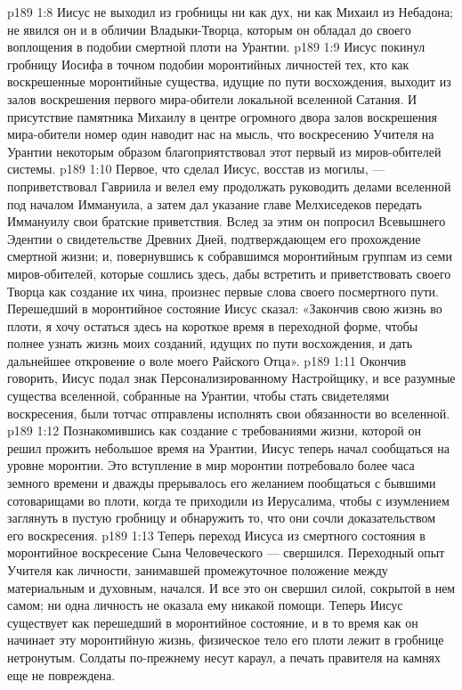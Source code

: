 \vs p189 1:8 \bibnobreakspace Иисус не выходил из гробницы ни как дух, ни как Михаил из Небадона; не явился он и в обличии Владыки\hyp{}Творца, которым он обладал до своего воплощения в подобии смертной плоти на Урантии.
\vs p189 1:9 \bibnobreakspace Иисус покинул гробницу Иосифа в точном подобии моронтийных личностей тех, кто как воскрешенные моронтийные существа, идущие по пути восхождения, выходит из залов воскрешения первого мира\hyp{}обители локальной вселенной Сатания. И присутствие памятника Михаилу в центре огромного двора залов воскрешения мира\hyp{}обители номер один наводит нас на мысль, что воскресению Учителя на Урантии некоторым образом благоприятствовал этот первый из миров\hyp{}обителей системы.
\vs p189 1:10 \pc Первое, что сделал Иисус, восстав из могилы, --- поприветствовал Гавриила и велел ему продолжать руководить делами вселенной под началом Иммануила, а затем дал указание главе Мелхиседеков передать Иммануилу свои братские приветствия. Вслед за этим он попросил Всевышнего Эдентии о свидетельстве Древних Дней, подтверждающем его прохождение смертной жизни; и, повернувшись к собравшимся моронтийным группам из семи миров\hyp{}обителей, которые сошлись здесь, дабы встретить и приветствовать своего Творца как создание их чина, произнес первые слова своего посмертного пути. Перешедший в моронтийное состояние Иисус сказал: «Закончив свою жизнь во плоти, я хочу остаться здесь на короткое время в переходной форме, чтобы полнее узнать жизнь моих созданий, идущих по пути восхождения, и дать дальнейшее откровение о воле моего Райского Отца».
\vs p189 1:11 Окончив говорить, Иисус подал знак Персонализированному Настройщику, и все разумные существа вселенной, собранные на Урантии, чтобы стать свидетелями воскресения, были тотчас отправлены исполнять свои обязанности во вселенной.
\vs p189 1:12 Познакомившись как создание с требованиями жизни, которой он решил прожить небольшое время на Урантии, Иисус теперь начал сообщаться на уровне моронтии. Это вступление в мир моронтии потребовало более часа земного времени и дважды прерывалось его желанием пообщаться с бывшими сотоварищами во плоти, когда те приходили из Иерусалима, чтобы с изумлением заглянуть в пустую гробницу и обнаружить то, что они сочли доказательством его воскресения.
\vs p189 1:13 Теперь переход Иисуса из смертного состояния в моронтийное воскресение Сына Человеческого --- свершился. Переходный опыт Учителя как личности, занимавшей промежуточное положение между материальным и духовным, начался. И все это он свершил силой, сокрытой в нем самом; ни одна личность не оказала ему никакой помощи. Теперь Иисус существует как перешедший в моронтийное состояние, и в то время как он начинает эту моронтийную жизнь, физическое тело его плоти лежит в гробнице нетронутым. Солдаты по\hyp{}прежнему несут караул, а печать правителя на камнях еще не повреждена.
